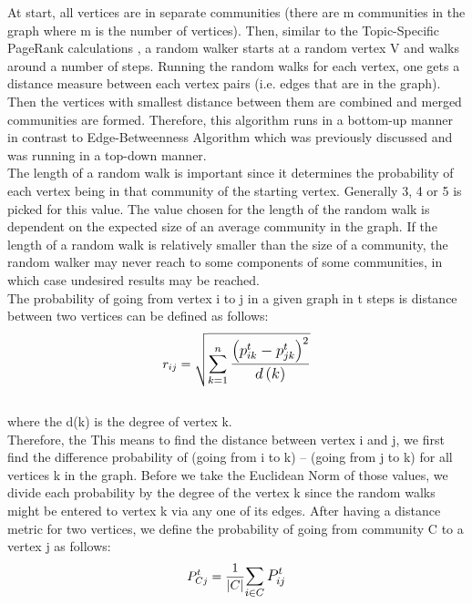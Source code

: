 \documentclass[10pt]{article}
\begin{document}
At start, all vertices are in separate communities (there are m communities in the graph where m is the number of vertices). Then, similar to the Topic-Specific PageRank calculations \cite{mmds}, a random walker starts at a random vertex V and walks around a number of steps. Running the random walks for each vertex, one gets a distance measure between each vertex pairs (i.e. edges that are in the graph)\cite{random}. Then the vertices with smallest distance between them are combined and merged communities are formed. Therefore, this algorithm runs in a bottom-up manner in contrast to Edge-Betweenness Algorithm which was previously discussed and was running in a top-down manner. \\

The length of a random walk is important since it determines the probability of each vertex being in that community of the starting vertex. Generally 3, 4 or 5 is picked for this value. The value chosen for the length of the random walk is dependent on the expected size of an average community in the graph. If the length of a random walk is relatively smaller than the size of a community, the random walker may never reach to some components of some communities, in which case undesired results may be reached. \\

The probability of going from vertex i to j in a given graph in t steps is distance between two vertices can be defined as follows: \\

\[ r_{ij} = \sqrt{ \mathlarger { \sum_{k=1}^{n} \frac{ \left( p_{ik}^{t} - p_{jk}^{t} \right)^{2} }{d\left( k \right) } } } \] \\

where the d(k) is the degree of vertex k. \\

Therefore, the
  This means to find the distance between vertex i and j, we first find the difference probability of (going from i to k) – (going from j to k) for all vertices k in the graph. Before we take the Euclidean Norm of those values, we divide each probability by the degree of the vertex k since the random walks might be entered to vertex k via any one of its edges.
After having a distance metric for two vertices, we define the probability of going from community C to a vertex j as follows: \\

\[ P_{Cj}^{t} = \frac{1}{|C|}  \mathlarger{ \sum_{i \in C} P_{ij}^{t} }  \] \\
\end{document}
